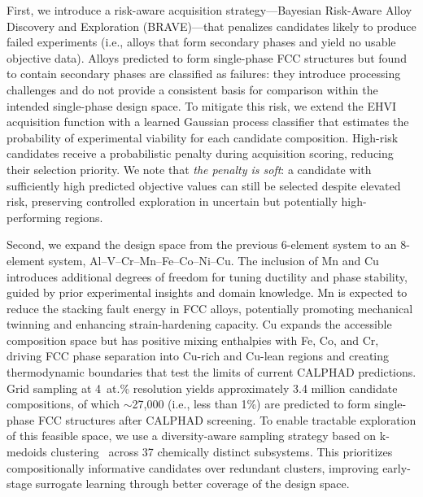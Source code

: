 
First, we introduce a risk-aware acquisition strategy---Bayesian Risk-Aware Alloy Discovery and Exploration (BRAVE)---that penalizes candidates likely to produce failed experiments (i.e., alloys that form secondary phases and yield no usable objective data). Alloys predicted to form single-phase FCC structures but found to contain secondary phases are classified as failures: they introduce processing challenges and do not provide a consistent basis for comparison within the intended single-phase design space. To mitigate this risk, we extend the EHVI acquisition function with a learned Gaussian process classifier that estimates the probability of experimental viability for each candidate composition. High-risk candidates receive a probabilistic penalty during acquisition scoring, reducing their selection priority. We note that \emph{the penalty is soft}: a candidate with sufficiently high predicted objective values can still be selected despite elevated risk, preserving controlled exploration in uncertain but potentially high-performing regions.


Second, we expand the design space from the previous 6-element system to an 8-element system, Al--V--Cr--Mn--Fe--Co--Ni--Cu. The inclusion of Mn and Cu introduces additional degrees of freedom for tuning ductility and phase stability, guided by prior experimental insights and domain knowledge. Mn is expected to reduce the stacking fault energy in FCC alloys, potentially promoting mechanical twinning and enhancing strain-hardening capacity. Cu expands the accessible composition space but has positive mixing enthalpies with Fe, Co, and Cr, driving FCC phase separation into Cu-rich and Cu-lean regions and creating thermodynamic boundaries that test the limits of current CALPHAD predictions. Grid sampling at 4~at.\% resolution yields approximately 3.4 million candidate compositions, of which $\sim$27{,}000 (i.e., less than 1\%) are predicted to form single-phase FCC structures after CALPHAD screening. To enable tractable exploration of this feasible space, we use a diversity-aware sampling strategy based on k-medoids clustering~\cite{paramore2025twoshot} across 37 chemically distinct subsystems. This prioritizes compositionally informative candidates over redundant clusters, improving early-stage surrogate learning through better coverage of the design space.

